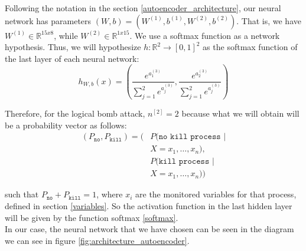 \documentclass{iosart2c}
\begin{document}
Following the notation in the section \ref{autoencoder_architecture}, our neural network has parameters $(W,b)=(W^{(1)},b^{(1)},W^{(2)},b^{(2)})$. That is, we have $W^{(1)} \in \mathbb {R}^{15x8}$, while $ W^{(2)} \in \mathbb {R}^{1x15}$. We use a softmax function as a network hypothesis. Thus, we will hypothesize $ h: \mathbb {R}^ {2} \rightarrow [0,1] ^ 2 $ as the softmax function of the last layer of each neural network: 
\begin{equation}\label{softmax}
h_{W,b}(x)=\left(\frac{e^{a_1^{(3)}}}{\sum_{j=1}^2 e^{a_j^{(3)}}},\frac{e^{a_2^{(3)}}}{\sum_{j=1}^2 e^{a_j^{(3)}}}\right)
\end{equation}


Therefore, for the logical bomb attack, $n^{[2]}=2$ because what we will obtain will be a probability vector as follows:
\begin{align*}
    (P_{\texttt{no}},P_{\texttt{kill}})=(&P(\texttt{no kill process } | \\
									    & X=x_1,\ldots,x_n),\\
                                         &P(\texttt{kill process } | \\
                                         & X=x_1,\ldots,x_n))
\end{align*}

such that  $P_{\texttt{no}}+P_{\texttt{kill}}=1$, where $x_i$ are the monitored variables for that process, defined in section \ref{variables}. So the activation function in the last hidden layer will be given by the function softmax \ref{softmax}. \\

In our case, the neural network that we have chosen can be seen in the diagram we can see in figure \ref{fig:architecture_autoencoder}.\\
\end{document}
